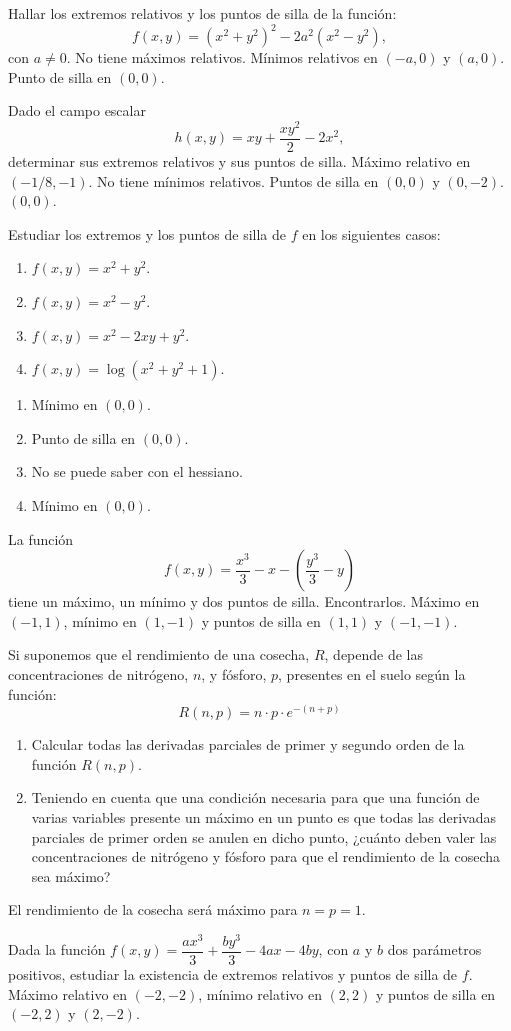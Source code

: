 
{Hallar los extremos relativos y los puntos de silla de la función:
\[
f(x,y) = (x^2+y^2)^2-2a^2(x^2-y^2),
\]
con $a\neq 0$.
}
{No tiene máximos relativos. Mínimos relativos en $(-a,0)$ y $(a,0)$. Punto de silla en $(0,0)$.
}
{
}


{Dado el campo escalar
\[
h(x,y) = xy+\frac{xy^2}{2}-2x^2,
\]
determinar sus extremos relativos y sus puntos de silla.
}
{Máximo relativo en $(-1/8,-1)$. No tiene mínimos relativos. Puntos de silla en $(0,0)$ y $(0,-2)$.
$(0,0)$.
}
{
}

{Estudiar los extremos y los puntos de silla de $f$ en los siguientes casos:
\begin{enumerate}
\item $f(x,y) = x^2+y^2$.
\item $f(x,y) = x^2-y^2$.
\item $f(x,y) = x^2-2xy+y^2$.
\item $f(x,y) = \log(x^2+y^2+1)$.
\end{enumerate}
}
{\begin{enumerate}
\item Mínimo en $(0,0)$.
\item Punto de silla en $(0,0)$.
\item No se puede saber con el hessiano.
\item Mínimo en $(0,0)$.
\end{enumerate}
}
{
}


{La función
\[
f(x,y) = \frac{x^3}{3}-x-\left(\frac{y^3}{3}-y\right)
\]
tiene un máximo, un mínimo y dos puntos de silla. Encontrarlos.
}
{Máximo en $(-1,1)$, mínimo en $(1,-1)$ y puntos de silla en $(1,1)$ y $(-1,-1)$.
}
{
}


{Si suponemos que el rendimiento de una cosecha, $R$, depende de las concentraciones de nitrógeno, $n$, y fósforo, $p$, presentes en el suelo según la función:
\[
R(n,p) = n \cdot p \cdot e^{ - (n + p)}
\]
\begin{enumerate}
\item Calcular todas las derivadas parciales de primer y segundo orden de la función $R(n,p)$.
\item Teniendo en cuenta que una condición necesaria para que una función de varias variables presente un máximo en un
punto es que todas las derivadas parciales de primer orden se anulen en dicho punto, ¿cuánto deben valer las
concentraciones de nitrógeno y fósforo para que el rendimiento de la cosecha sea máximo?
\end{enumerate}
}
{El rendimiento de la cosecha será máximo para $n=p=1$.
}
{
}


{Dada la función $f(x,y)=\dfrac{ax^3}{3} + \dfrac{by^3}{3}-4ax-4by$, con $a$ y $b$ dos parámetros positivos, estudiar la existencia de extremos relativos y puntos de silla de $f$.
}
{Máximo relativo en $(-2,-2)$, mínimo relativo en $(2,2)$ y puntos de silla en $(-2,2)$ y $(2,-2)$.
}
{
}
